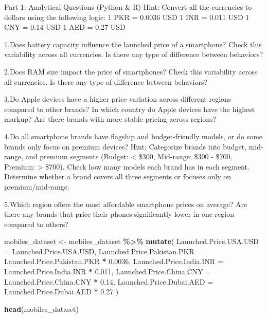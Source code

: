 \documentclass[
]{article}
\newenvironment{Shaded}{\begin{snugshade}}{\end{snugshade}}
\newcommand{\AttributeTok}[1]{\textcolor[rgb]{0.13,0.29,0.53}{#1}}
\newcommand{\FloatTok}[1]{\textcolor[rgb]{0.00,0.00,0.81}{#1}}
\newcommand{\FunctionTok}[1]{\textcolor[rgb]{0.13,0.29,0.53}{\textbf{#1}}}
\newcommand{\NormalTok}[1]{#1}
\newcommand{\OtherTok}[1]{\textcolor[rgb]{0.56,0.35,0.01}{#1}}
\newcommand{\SpecialCharTok}[1]{\textcolor[rgb]{0.81,0.36,0.00}{\textbf{#1}}}
\begin{document}
Part 1: Analytical Questions (Python \& R) Hint: Convert all the
currencies to dollars using the following logic: 1 PKR = 0.0036 USD 1
INR = 0.011 USD 1 CNY = 0.14 USD 1 AED = 0.27 USD

1.Does battery capacity influence the launched price of a smartphone?
Check this variability across all currencies. Is there any type of
difference between behaviors?

2.Does RAM size impact the price of smartphones? Check this variability
across all currencies. Is there any type of difference between
behaviors?

3.Do Apple devices have a higher price variation across different
regions compared to other brands? In which country do Apple devices have
the highest markup? Are there brands with more stable pricing across
regions?

4.Do all smartphone brands have flagship and budget-friendly models, or
do some brands only focus on premium devices? Hint: Categorize brands
into budget, mid-range, and premium segments (Budget: \textless{} \$300,
Mid-range: \$300 - \$700, Premium: \textgreater{} \$700). Check how many
models each brand has in each segment. Determine whether a brand covers
all three segments or focuses only on premium/mid-range.

5.Which region offers the most affordable smartphone prices on average?
Are there any brands that price their phones significantly lower in one
region compared to others?

\begin{Shaded}
\begin{Highlighting}[]
\NormalTok{mobiles\_dataset }\OtherTok{\textless{}{-}}\NormalTok{ mobiles\_dataset }\SpecialCharTok{\%\textgreater{}\%}
  \FunctionTok{mutate}\NormalTok{(}
    \AttributeTok{Launched.Price.USA.USD =}\NormalTok{ Launched.Price.USA.USD,}
    \AttributeTok{Launched.Price.Pakistan.PKR =}\NormalTok{ Launched.Price.Pakistan.PKR }\SpecialCharTok{*} \FloatTok{0.0036}\NormalTok{,}
    \AttributeTok{Launched.Price.India.INR =}\NormalTok{ Launched.Price.India.INR }\SpecialCharTok{*} \FloatTok{0.011}\NormalTok{,}
    \AttributeTok{Launched.Price.China.CNY =}\NormalTok{ Launched.Price.China.CNY }\SpecialCharTok{*} \FloatTok{0.14}\NormalTok{,}
    \AttributeTok{Launched.Price.Dubai.AED =}\NormalTok{ Launched.Price.Dubai.AED }\SpecialCharTok{*} \FloatTok{0.27}
\NormalTok{  )}

\FunctionTok{head}\NormalTok{(mobiles\_dataset)}
\end{Highlighting}
\end{Shaded}
\end{document}

